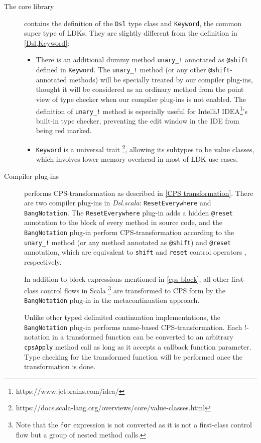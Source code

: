 \begin{description}
  \item[The core library] contains the definition of the \lstinline{Dsl} type class and \lstinline{Keyword}, the common super type of LDKs. They are slightly different from the definition in \cref{Dsl,Keyword}:
  \begin{itemize}
    \item There is an additional dummy method \lstinline{unary_!} annotated as \lstinline{@shift} defined in \lstinline{Keyword}. The \lstinline{unary_!} method (or any other \lstinline{@shift}-annotated methods) will be specially treated by our compiler plug-ins, thought it will be considered as an ordinary method from the point view of type checker when our compiler plug-ins is not enabled. The definition of \lstinline{unary_!} method is especially useful for IntelliJ IDEA\footnote{https://www.jetbrains.com/idea/}'s built-in type checker, preventing the edit window in the IDE from being red marked.
    \item \lstinline{Keyword} is a universal trait \footnote{https://docs.scala-lang.org/overviews/core/value-classes.html}, allowing its subtypes to be value classes, which involves lower memory overhead in most of LDK use cases.
  \end{itemize}
  \item[Compiler plug-ins] performs CPS-transformation as described in \cref{CPS transformation}. There are two compiler plug-ins in \textit{Dsl.scala}: \lstinline{ResetEverywhere} and \lstinline{BangNotation}. The \lstinline{ResetEverywhere} plug-in adds a hidden \lstinline{@reset} annotation to the block of every method in source code, and the \lstinline{BangNotation} plug-in perform CPS-transformation according to the \lstinline{unary_!} method (or any method annotated as \lstinline{@shift}) and \lstinline{@reset} annotation, which are equivalent to \lstinline{shift} and \lstinline{reset} control operators \cite{danvy1989functional}, respectively.

  In addition to block expressions mentioned in \cref{cps-block}, all other first-class control flows in Scala  \footnote{Note that the \lstinline{for} expression is not converted as it is not a first-class control flow but a group of nested method calls.} are transformed to CPS form by the \lstinline{BangNotation} plug-in in the metacontinuation \cite{Danvy1990AbstractingC} approach.

  Unlike other typed delimited continuation implementations, the \lstinline{BangNotation} plug-in performs name-based CPS-transformation. Each !-notation in a transformed function can be converted to an arbitrary \lstinline{cpsApply} method call as long as it accepts a callback function parameter. Type checking for the transformed function will be performed once the transformation is done.


\end{description}
